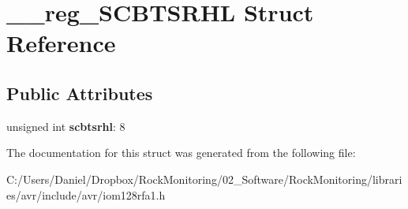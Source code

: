 \hypertarget{struct____reg___s_c_b_t_s_r_h_l}{}\section{\+\_\+\+\_\+reg\+\_\+\+S\+C\+B\+T\+S\+R\+HL Struct Reference}
\label{struct____reg___s_c_b_t_s_r_h_l}
\subsection*{Public Attributes}
\begin{DoxyCompactItemize}
\item 
unsigned int {\bfseries scbtsrhl}\+: 8\hypertarget{struct____reg___s_c_b_t_s_r_h_l_acbe6348d33d12d6f088c44433b4853ab}{}\label{struct____reg___s_c_b_t_s_r_h_l_acbe6348d33d12d6f088c44433b4853ab}

\end{DoxyCompactItemize}


The documentation for this struct was generated from the following file\+:\begin{DoxyCompactItemize}
\item 
C\+:/\+Users/\+Daniel/\+Dropbox/\+Rock\+Monitoring/02\+\_\+\+Software/\+Rock\+Monitoring/libraries/avr/include/avr/iom128rfa1.\+h\end{DoxyCompactItemize}
